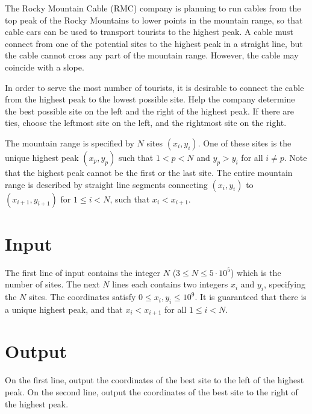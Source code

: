 
The Rocky Mountain Cable (RMC) company is planning to run cables from
the top peak of the Rocky Mountains to lower points in the mountain
range, so that cable cars can be used to transport tourists to the
highest peak.  A cable must connect from one of the potential sites
to the highest peak in a straight line, but the cable cannot cross any
part of the mountain range.  However, the cable may coincide with a
slope.

In order to serve the most number of tourists, it is desirable to
connect the cable from the highest peak to the lowest possible
site.  Help the company determine the best possible site on the
left and the right of the highest peak.  If there are ties, choose the
leftmost site on the left, and the rightmost site on the right.

The mountain range is specified by $N$ sites $(x_i, y_i)$. One of 
these sites is the unique highest peak $(x_p, y_p)$ such that $1 < p < 
N$ and $y_p > y_i$ for all $i \neq p$.  Note that the highest peak
cannot be the first or the last site.  The entire mountain range is 
described by straight line segments connecting $(x_i, y_i)$ to 
$(x_{i+1}, y_{i+1})$ for $1 \leq i < N$, such that $x_i < 
x_{i+1}$.

\section*{Input} 
The first line of input contains the integer $N$
($3 \leq N \leq 5 \cdot 10^5$) which is the number of sites.  The
next $N$ lines each contains two integers $x_i$ and $y_i$, specifying
the $N$ sites.  The coordinates satisfy $0 \leq x_i, y_i \leq 10^9$.
It is guaranteed that there is a unique highest peak, and that
$x_i < x_{i+1}$ for all $1 \leq i < N$.

\section*{Output} 

On the first line, output the coordinates of the best site to the left
of the highest peak.  On the second line, output the coordinates of
the best site to the right of the highest peak.
